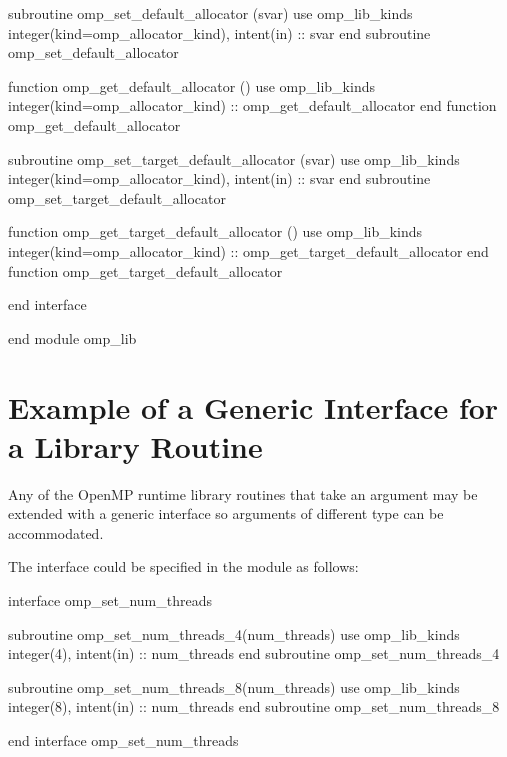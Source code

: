 {\begin{codepar}
          subroutine omp\_set\_default\_allocator (svar)
           use omp\_lib\_kinds
           integer(kind=omp\_allocator\_kind), intent(in) :: svar
          end subroutine omp\_set\_default\_allocator

          function omp\_get\_default\_allocator ()
           use omp\_lib\_kinds
           integer(kind=omp\_allocator\_kind) :: omp\_get\_default\_allocator
          end function omp\_get\_default\_allocator

          subroutine omp\_set\_target\_default\_allocator (svar)
           use omp\_lib\_kinds
           integer(kind=omp\_allocator\_kind), intent(in) :: svar
          end subroutine omp\_set\_target\_default\_allocator

          function omp\_get\_target\_default\_allocator ()
           use omp\_lib\_kinds
           integer(kind=omp\_allocator\_kind) :: omp\_get\_target\_default\_allocator
          end function omp\_get\_target\_default\_allocator

          end interface

        end module omp\_lib
\end{codepar}} %






\pagebreak
\section{Example of a Generic Interface for a Library Routine}
\label{sec:Example of a Generic Interface for a Library Routine}
Any of the OpenMP runtime library routines that take an argument may be extended 
with a generic interface so arguments of different  type can be accommodated.

The  interface could be specified in the  module 
as follows:

\begin{boxedcode}
interface omp\_set\_num\_threads

    subroutine omp\_set\_num\_threads_4(num\_threads)
      use omp\_lib\_kinds
      integer(4), intent(in) :: num\_threads
    end subroutine omp\_set\_num\_threads_4

    subroutine omp\_set\_num\_threads_8(num\_threads)
      use omp\_lib\_kinds
      integer(8), intent(in) :: num\_threads
    end subroutine omp\_set\_num\_threads_8

end interface omp\_set\_num\_threads
\end{boxedcode}


